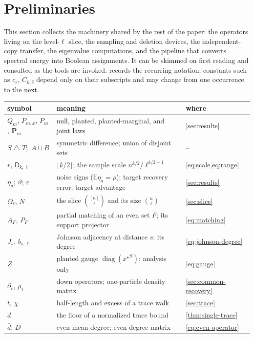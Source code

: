 \documentclass[11pt]{article}
\theoremstyle{definition}
\theoremstyle{remark}
\newcommand{\E}{\mathbb E}
\newcommand{\1}{\mathbf 1}
\newcommand{\sd}{\mathbin{\triangle}}
\newcommand{\bd}{\bar d}
\newcommand{\eps}{\varepsilon}
\newcommand{\Dkl}{\mathsf D_{k,\ell}}
\newcommand{\xstar}{{x^\star}}
\newcommand{\rhoone}{\rho_1}
\DeclareMathOperator{\diag}{diag}
\numberwithin{equation}{section}
\begin{document}
\section{Preliminaries}\label{sec:prelim}

This section collects the machinery shared by the rest of the paper:
the operators living on the level-$\ell$ slice, the sampling and
deletion devices, the independent-copy transfer, the eigenvalue computations,
and the pipeline that converts
spectral energy into Boolean assignments.  It can be skimmed on first
reading and consulted as the tools are invoked.
 records the recurring notation; constants such as
$c_r$, $C_{k,\delta}$ depend only on their subscripts and may change
from one occurrence to the next.

\begin{table}[t]
\centering\small\renewcommand{\arraystretch}{1.15}
\begin{tabular}{@{}lll@{}}
\toprule
symbol & meaning & where\\
\midrule
$Q_m$, $P_{m,x}$, $P_m$, $\mathbf P_m$ & null, planted, planted-marginal, and joint laws & \cref{sec:results}\\
$S\sd T$;\ $A\mathbin{\dot\cup}B$ & symmetric difference; union of disjoint sets & --\\
$r$, $\Dkl$ & $\lfloor k/2\rfloor$; the sample scale $n^{k/2}/\ell^{k/2-1}$ & \cref{eq:scale,eq:range}\\
$\eta_a$; $\vartheta$; $\eps$ & noise signs ($\E\eta_a=\rho$); target recovery error; target advantage & \cref{sec:results}\\
$\Omega_\ell$, $N$ & the slice $\binom{[n]}\ell$ and its size $\binom n\ell$ & \cref{sec:slice}\\
$A_F$, $P_F$ & partial matching of an even set $F$; its support projector & \cref{eq:matching}\\
$J_s$, $b_{s,\ell}$ & Johnson adjacency at distance $s$; its degree & \cref{eq:johnson-degree}\\
$Z$ & planted gauge $\diag(\xstar^S)$; analysis only & \cref{eq:gauge}\\
$\partial_\ell$, $\rhoone$ & down operators; one-particle density matrix & \cref{sec:common-recovery}\\
$t$, $\chi$ & half-length and excess of a trace walk & \cref{sec:trace}\\
$d$ & the floor of a normalized trace bound & \cref{thm:single-trace}\\
$\bd$; $D$ & even mean degree; even degree matrix & \cref{eq:even-operator}\\

\end{tabular}
\end{table}
\end{document}
